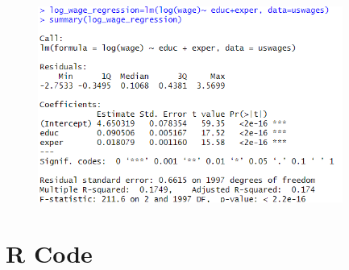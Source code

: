 \documentclass[12pt, letterpaper]{article}
\theoremstyle{definition}
\numberwithin{equation}{section}
\newcommand{\+}[1]{+_{\scalebox{.375}{#1}}}
\newcommand{\1}{\mathbbm{1}}
\begin{document}
\begin{figure}[H]
	\centering
	\includegraphics[width=10cm]{Log Wage Regression}
\end{figure}




\newpage
\section*{R Code}
\end{document}
